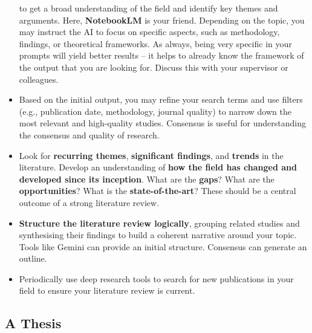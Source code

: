 \documentclass[
  10t,
]{article}
\begin{document}
\begin{itemize}
  to get a broad understanding of the field and identify key themes and
  arguments. Here, \textbf{NotebookLM} is your friend. Depending on the
  topic, you may instruct the AI to focus on specific aspects, such as
  methodology, findings, or theoretical frameworks. As always, being
  very specific in your prompts will yield better results -- it helps to
  already know the framework of the output that you are looking for.
  Discuss this with your supervisor or colleagues.
\item
  Based on the initial output, you may refine your search terms and use
  filters (e.g., publication date, methodology, journal quality) to
  narrow down the most relevant and high-quality studies. Consensus is
  useful for understanding the consensus and quality of research.
\item
  Look for \textbf{recurring themes}, \textbf{significant findings}, and
  \textbf{trends} in the literature. Develop an understanding of
  \textbf{how the field has changed and developed since its inception}.
  What are the \textbf{gaps}? What are the \textbf{opportunities}? What
  is the \textbf{state-of-the-art}? These should be a central outcome of
  a strong literature review.
\item
  \textbf{Structure the literature review logically}, grouping related
  studies and synthesising their findings to build a coherent narrative
  around your topic. Tools like Gemini can provide an initial structure.
  Consensus can generate an outline.
\item
  Periodically use deep research tools to search for new publications in
  your field to ensure your literature review is current.
\end{itemize}

\subsection{A Thesis}\label{a-thesis}
\end{document}
